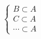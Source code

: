 \documentclass[preview]{standalone}
\begin{document}
\begin{align*}
\begin{cases}
                         B \subset A \\
                         C \subset A \\
                         \cdots \subset A
                         \end{cases}
\end{align*}
\end{document}
